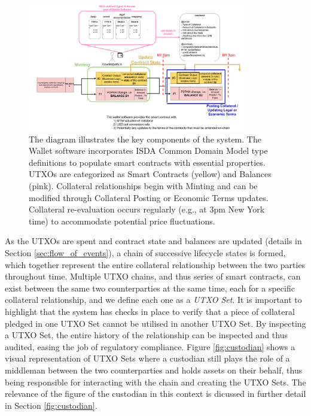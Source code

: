 \begin{figure}[!h]
    \centering
    \includegraphics[angle=90, width=0.85\textwidth]{images/chapter 3/Architecture (for draft).drawio.pdf}
    \caption[High-Level Architecture Diagram]{The diagram illustrates the key components of the system. The Wallet software incorporates ISDA Common Domain Model type definitions to populate smart contracts with essential properties. UTXOs are categorized as Smart Contracts (yellow) and Balances (pink). Collateral relationships begin with Minting and can be modified through Collateral Posting or Economic Terms updates. Collateral re-evaluation occurs regularly (e.g., at 3pm New York time) to accommodate potential price fluctuations.}
    \label{fig:architecture-diagram}
\end{figure}
\restoregeometry

As the UTXOs are spent and contract state and balances are updated (details in Section \ref{sec:flow_of_events}), a chain of successive lifecycle states is formed, which together represent the entire collateral relationship between the two parties throughout time. Multiple UTXO chains, and thus series of smart contracts, can exist between the same two counterparties at the same time, each for a specific collateral relationship, and we define each one as a \textit{UTXO Set}. It is important to highlight that the system has checks in place to verify that a piece of collateral pledged in one UTXO Set cannot be utilised in another UTXO Set. By inspecting a UTXO Set, the entire history of the relationship can be inspected and thus audited, easing the job of regulatory compliance. Figure \ref{fig:custodian} shows a visual representation of UTXO Sets where a custodian still plays the role of a middleman between the two counterparties and holds assets on their behalf, thus being responsible for interacting with the chain and creating the UTXO Sets. The relevance of the figure of the custodian in this context is dicussed in further detail in Section \ref{fig:custodian}.

